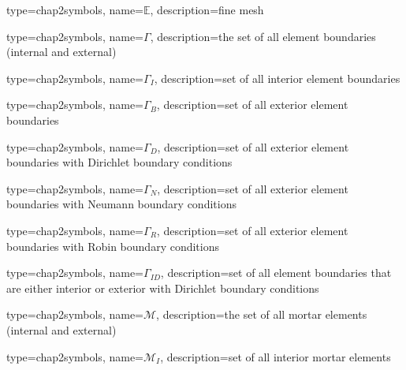                  {
                   type=chap2symbols,
                   name=$\mathbb{E}$,
                   description={fine mesh}
                 }


                 {
                   type=chap2symbols,
                   name=$\Gamma$,
                   description={the set of all element boundaries (internal and external)}
                 }

                 {
                   type=chap2symbols,
                   name=$\Gamma_I$,
                   description={set of all interior element boundaries}
                 }


                 {
                   type=chap2symbols,
                   name=$\Gamma_B$,
                   description={set of all exterior element boundaries}
                 }


                 {
                   type=chap2symbols,
                   name=$\Gamma_D$,
                   description={set of all exterior element boundaries with Dirichlet boundary conditions}
                 }

                 {
                   type=chap2symbols,
                   name=$\Gamma_N$,
                   description={set of all exterior element boundaries with Neumann boundary conditions}
                 }


                 {
                   type=chap2symbols,
                   name=$\Gamma_R$,
                   description={set of all exterior element boundaries with Robin boundary conditions}
                 }

                 {
                   type=chap2symbols,
                   name=$\Gamma_{ID}$,
                   description={set of all element boundaries that are either interior or exterior with Dirichlet boundary conditions}
                 }


                 {
                   type=chap2symbols,
                   name=$\mathcal{M}$,
                   description={the set of all mortar elements (internal and external)}
                 }

                 {
                   type=chap2symbols,
                   name=$\mathcal{M}_I$,
                   description={set of all interior mortar elements}
                 }


